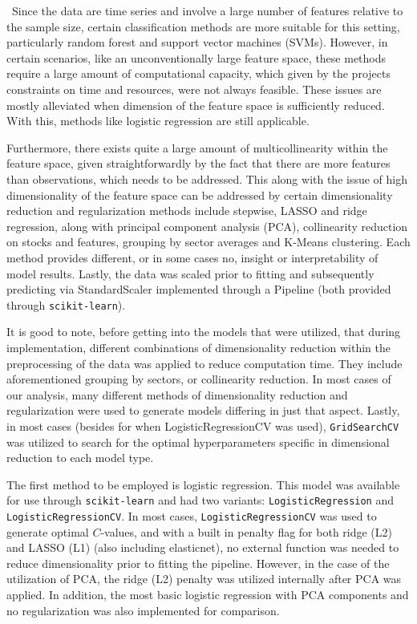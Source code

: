 \documentclass[11pt]{article}
\begin{document}
\quad \ Since the data are time series and involve a large number of features relative to the sample size, certain classification methods are more suitable for this setting, particularly random forest and support vector machines (SVMs). However, in certain scenarios, like an unconventionally large feature space, these methods require a large amount of computational capacity, which given by the projects constraints on time and resources, were not always feasible. These issues are mostly alleviated when dimension of the feature space is sufficiently reduced. With this, methods like logistic regression are still applicable. %

Furthermore, there exists quite a large amount of multicollinearity within the feature space, given straightforwardly by the fact that there are more features than observations, which needs to be addressed. This along with the issue of high dimensionality of the feature space can be addressed by certain dimensionality reduction and regularization methods include stepwise, LASSO and ridge regression, along with principal component analysis (PCA), collinearity reduction on stocks and features, grouping by sector averages and K-Means clustering. Each method provides different, or in some cases no, insight or interpretability of model results. Lastly, the data was scaled prior to fitting and subsequently predicting via StandardScaler implemented through a Pipeline (both provided through \verb|scikit-learn|).%

It is good to note, before getting into the models that were utilized, that during implementation, different combinations of dimensionality reduction within the preprocessing of the data was applied to reduce computation time. They include aforementioned grouping by sectors, or collinearity reduction.  In most cases of our analysis, many different methods of dimensionality reduction and regularization were used to generate models differing in just that aspect. Lastly, in most cases (besides for when LogisticRegressionCV was used), \verb|GridSearchCV| was utilized to search for the optimal hyperparameters specific in dimensional reduction to each model type.

The first method to be employed is logistic regression. This model was available for use through \verb|scikit-learn| and had two variants: \verb|LogisticRegression| and \verb|LogisticRegressionCV|. In most cases, \verb|LogisticRegressionCV| was used to generate optimal $C$-values, and with a built in penalty flag for both ridge (L2) and LASSO (L1) (also including elasticnet), no external function was needed to reduce dimensionality prior to fitting the pipeline. However, in the case of the utilization of PCA, the ridge (L2) penalty was utilized internally after PCA was applied. In addition, the most basic logistic regression with PCA components and no regularization was also implemented for comparison.
\end{document}
